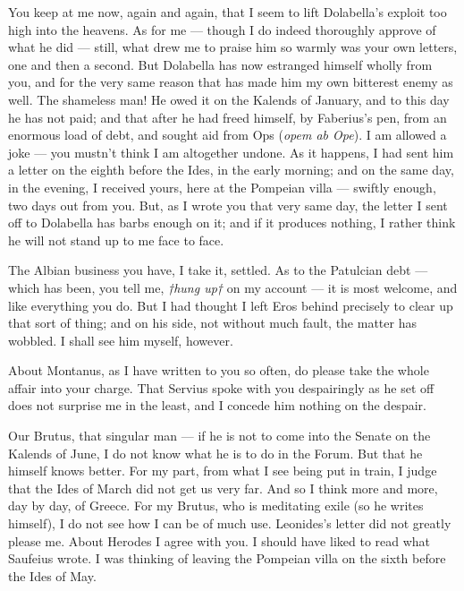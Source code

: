 

 You keep at me now, again and again, that I seem to lift Dolabella's exploit too high into the heavens. As for me --- though I do indeed thoroughly approve of what he did --- still, what drew me to praise him so warmly was your own letters, one and then a second. But Dolabella has now estranged himself wholly from you, and for the very same reason that has made him my own bitterest enemy as well. The shameless man! He owed it on the Kalends of January, and to this day he has not paid; and that after he had freed himself, by Faberius's pen, from an enormous load of debt, and sought aid from Ops (\textit{opem ab Ope}). I am allowed a joke --- you mustn't think I am altogether undone. As it happens, I had sent him a letter on the eighth before the Ides, in the early morning; and on the same day, in the evening, I received yours, here at the Pompeian villa --- swiftly enough, two days out from you. But, as I wrote you that very same day, the letter I sent off to Dolabella has barbs enough on it; and if it produces nothing, I rather think he will not stand up to me face to face.

 The Albian business you have, I take it, settled. As to the Patulcian debt --- which has been, you tell me, \textit{†hung up†} on my account --- it is most welcome, and like everything you do. But I had thought I left Eros behind precisely to clear up that sort of thing; and on his side, not without much fault, the matter has wobbled. I shall see him myself, however.

 About Montanus, as I have written to you so often, do please take the whole affair into your charge. That Servius spoke with you despairingly as he set off does not surprise me in the least, and I concede him nothing on the despair.

 Our Brutus, that singular man --- if he is not to come into the Senate on the Kalends of June, I do not know what he is to do in the Forum. But that he himself knows better. For my part, from what I see being put in train, I judge that the Ides of March did not get us very far. And so I think more and more, day by day, of Greece. For my Brutus, who is meditating exile (so he writes himself), I do not see how I can be of much use. Leonides's letter did not greatly please me. About Herodes I agree with you. I should have liked to read what Saufeius wrote. I was thinking of leaving the Pompeian villa on the sixth before the Ides of May.
